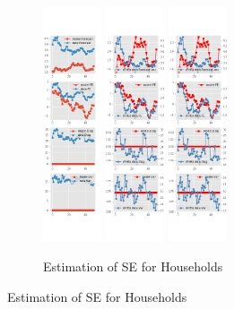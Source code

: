 \documentclass[]{article}
\begin{document}
\begin{figure}[htbp]
	\centering
	\begin{subfigure}[b]{\textwidth}
		\centering
		\caption{Estimation of SE for Households}
		\label{SE_diag_SCE}
		\includegraphics[width=0.19\textwidth]{figures/sce_se_est_diag0.png}
		\includegraphics[width=0.19\textwidth]{figures/sce_se_est_diag1.png}
		\includegraphics[width=0.19\textwidth]{figures/sce_se_est_diag2.png}

\end{subfigure}
\end{figure}
\end{document}
